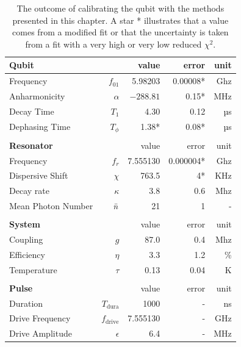 \begin{table}[h]
\centering
\caption{The outcome of calibrating the qubit with the methods presented in this chapter. A star * illustrates that a value comes from a modified fit or that the uncertainty is taken from a fit with a very high or very low reduced $\chi^2$. }
\begin{tabular}{lr|rrr}
\hline
\textbf{Qubit}                &          & value & error  & unit \\ \hline
Frequency                     & $f_{01}$ &  5.98203       &  0.00008* & Ghz  \\
Anharmonicity                 & $\alpha$ &  $-288.81$     &  0.15*    & MHz  \\
Decay Time                    & $T_1$    &  4.30          &  0.12     & µs   \\
Dephasing Time                & $T_\phi$ &  1.38*         &  0.08*    & µs   \\ 
& & & & \\ \hline 

\textbf{Resonator}                &        & value      & error    & unit \\ \hline
Frequency                     & $f_{r}$    &  7.555130  & 0.000004*& Ghz  \\
Dispersive Shift              & $\chi$     &  763.5     & 4*       & KHz \\
Decay rate                    & $\kappa$   &  3.8       & 0.6      & Mhz  \\
Mean Photon Number            & $\Bar{n}$  &  21        & 1        &  -  \\
 

& & & & \\ \hline 
\textbf{System}                &          & value & error & unit \\ \hline
Coupling                       & $g$      &  87.0         & 0.4    & Mhz  \\
Efficiency                     & $\eta$   &  3.3          & 1.2    & \% \\
Temperature                    & $\tau$   &  0.13         & 0.04   & K \\
& & & & \\ \hline

\hline
\textbf{Pulse}                &                 & value      & error    & unit \\ \hline
Duration                      & $T_{\text{dura}}$  &  1000     & -        & ns   \\
Drive Frequency               & $f_{\text{drive}}$ &  7.555130 & -        & GHz  \\ 
Drive Amplitude               & $\epsilon$         &  6.4      & -        & MHz  \\ 
\end{tabular}
\label{tab:qubit_calibration}
\end{table}